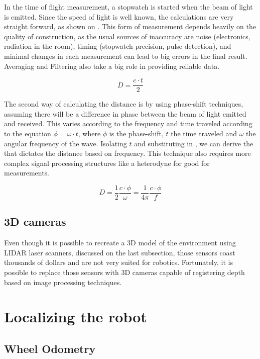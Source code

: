 In the time of flight measurement, a stopwatch is started when the beam of light is emitted. Since the speed of light is well known, the calculations are very straight forward, as shown on . This form of measurement depends heavily on the quality of construction, as the usual sources of inaccuracy are noise (electronics, radiation in the room), timing (stopwatch precision, pulse detection), and minimal changes in each measurement can lead to big errors in the final result. Averaging and Filtering also take a big role in providing reliable data.

\begin{equation} \label{eq:d}
D = \frac{c \cdot t}{2}
\end{equation}

The second way of calculating the distance is by using phase-shift techniques, assuming there will be a difference in phase between the beam of light emitted and received. This varies according to the frequency and time traveled according to the equation $\phi = \omega \cdot t$, where $\phi$ is the phase-shift, $t$ the time traveled and $\omega$ the angular frequency of the wave. Isolating $t$ and substituting in , we can derive the  that dictates the distance based on frequency. This technique also requires more complex signal processing structures like a heterodyne for good for measurements.

\begin{equation} \label{eq:d2}
D = \frac{1}{2} \frac{c \cdot \phi}{\omega} = \frac{1}{4 \pi} \frac{c \cdot \phi}{f}
\end{equation}

\subsection{3D cameras}

Even though it is possible to recreate a 3D model of the environment using LIDAR laser scanners, discussed on the last subsection, those sensors coast thousands of dollars and are not very suited for robotics. Fortunately, it is possible to replace those sensors with 3D cameras capable of registering depth based on image processing techniques.

\section{Localizing the robot}

\subsection{Wheel Odometry}

